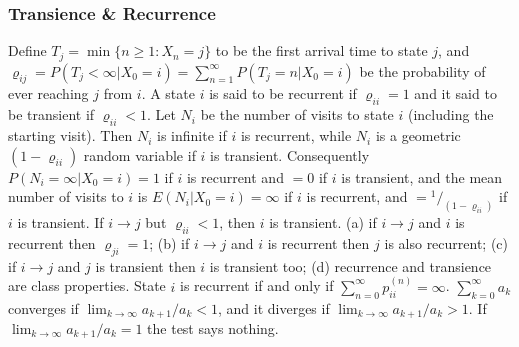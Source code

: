 \subsubsection*{Transience \& Recurrence}
 Define $T_j = \min\{n \ge 1 : X_n = j\}$ to be the first arrival time to state $j$, and $\varrho_{ij} = P(T_j < \infty|X_0 = i) = \sum^\infty_{n=1}P(T_j = n| X_0 = i)$ be the probability of ever reaching $j$ from $i$.
 A state $i$ is said to be recurrent if $\varrho_{ii} = 1$ and it said to be transient if $\varrho_{ii} < 1$.
 Let $N_i$ be the number of visits to state $i$ (including the starting visit). Then $N_i$ is infinite if $i$ is recurrent, while $N_i$ is a geometric $(1- \varrho_{ii})$ random variable if $i$ is transient. Consequently $P(N_i = \infty|X_0 = i) = 1$ if $i$ is recurrent and $= 0$ if $i$ is transient, and the mean number of visits to $i$ is $E(N_i|X_0 = i) = \infty$ if $i$ is recurrent, and $=\!^1/_{(1-\varrho_{ii})}$ if $i$ is transient.
 If $i \to j$ but $\varrho_{ii} < 1$, then $i$ is transient.
 (a) if $i \to j$ and $i$ is recurrent then $\varrho_{ji} = 1$; 
(b) if $i \to j$ and $i$ is recurrent then $j$ is also recurrent; 
(c) if $i \to j$ and $j$ is transient then $i$ is transient too; 
(d) recurrence and transience are class properties.
 State $i$ is recurrent if and only if $\sum^{\infty}_{n=0} p^{(n)}_{ii} = \infty$.
 $\sum^{\infty}_{k=0} a_k$ converges if $\lim_{k\to \infty} a_{k+1}/a_k < 1$, and it diverges if $\lim_{k\to \infty} a_{k+1}/a_k > 1$. If $\lim_{k\to \infty} a_{k+1}/a_k = 1$ the test says nothing.
